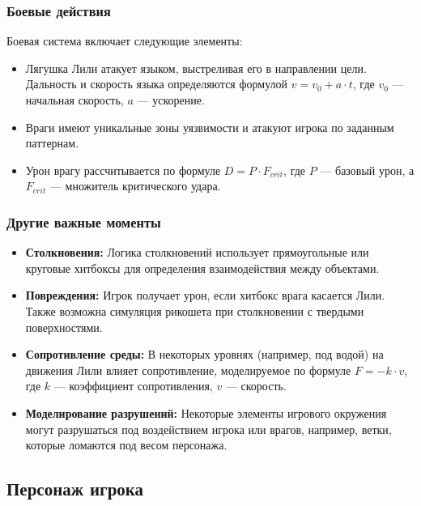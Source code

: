 \documentclass{article}
\begin{document}
\subsubsection{Боевые действия}
Боевая система включает следующие элементы:
\begin{itemize}
    \item Лягушка Лили атакует языком, выстреливая его в направлении цели. Дальность и скорость языка определяются формулой $v = v_0 + a \cdot t$, где $v_0$ — начальная скорость, $a$ — ускорение.
    \item Враги имеют уникальные зоны уязвимости и атакуют игрока по заданным паттернам.
    \item Урон врагу рассчитывается по формуле $D = P \cdot F_{crit}$, где $P$ — базовый урон, а $F_{crit}$ — множитель критического удара.
\end{itemize}

\subsubsection{Другие важные моменты}
\begin{itemize}
    \item \textbf{Столкновения:} Логика столкновений использует прямоугольные или круговые хитбоксы для определения взаимодействия между объектами.
    \item \textbf{Повреждения:} Игрок получает урон, если хитбокс врага касается Лили. Также возможна симуляция рикошета при столкновении с твердыми поверхностями.
    \item \textbf{Сопротивление среды:} В некоторых уровнях (например, под водой) на движения Лили влияет сопротивление, моделируемое по формуле $F = -k \cdot v$, где $k$ — коэффициент сопротивления, $v$ — скорость.
    \item \textbf{Моделирование разрушений:} Некоторые элементы игрового окружения могут разрушаться под воздействием игрока или врагов, например, ветки, которые ломаются под весом персонажа.
\end{itemize}

\subsection{Персонаж игрока}
\end{document}
